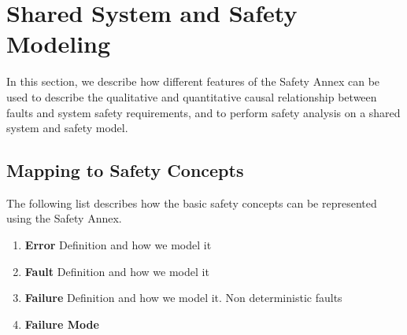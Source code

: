 \section{Shared System and Safety Modeling}
\label{sec:safety_modeling}

In this section, we describe how different features of the Safety Annex can be used to describe the qualitative and quantitative causal relationship between faults and system safety requirements, and to perform safety analysis on a shared system and safety model.

\subsection{Mapping to Safety Concepts}
The following list describes how the basic safety concepts can be represented using the Safety Annex.

\begin{enumerate}
	\item \textbf{Error} Definition and how we model it
	\item \textbf{Fault} Definition and how we model it
	\item \textbf{Failure} Definition and how we model it. Non deterministic faults
	\item \textbf{Failure Mode} 
\end{enumerate}



\begin{comment}
Errors/Faults/Failures - to a safety engineer, these terms have very specific meanings.  You will see my specific comments on this topic where I located them by your Section 3.3.  If needed, we can talk about this comment after I send you my mark-ups.
In Section 3.1, you introduce the term "non-deterministic".  I am not sure how your new process can be used by the safety engineering discipline unless things are "deterministic" and therefore "repeatable".
\end{comment}



